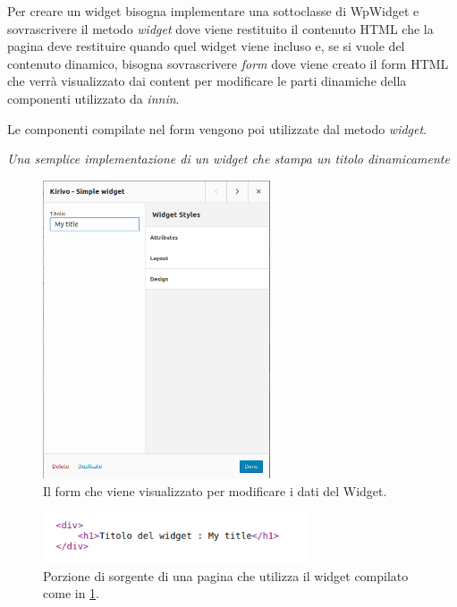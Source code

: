 Per creare un widget bisogna implementare una sottoclasse di WpWidget\cite{WPWID}
e sovrascrivere il metodo \emph{widget} dove viene restituito il contenuto HTML che la pagina deve restituire quando quel widget viene incluso
e, se si vuole del contenuto dinamico, bisogna sovrascrivere \emph{form} dove viene creato il form HTML che verrà visualizzato dai content per modificare le
parti dinamiche della componenti utilizzato da \emph{innin}.

Le componenti compilate nel form vengono poi utilizzate dal metodo \emph{widget}.



\emph{Una semplice implementazione di un widget che stampa un titolo dinamicamente}


\begin{figure}
  \includegraphics[width=0.6\textwidth]{figure/wid_form.png}
  \caption{Il form che viene visualizzato per modificare i dati del Widget.}
  \label{fig:wform}
\end{figure}
\begin{figure}
  \includegraphics[width=0.7\textwidth]{figure/sourcewid.png}
  \caption{Porzione di sorgente di una pagina che utilizza il widget compilato come in \ref{fig:wform}.}
  \label{fig:wsource}
\end{figure}

